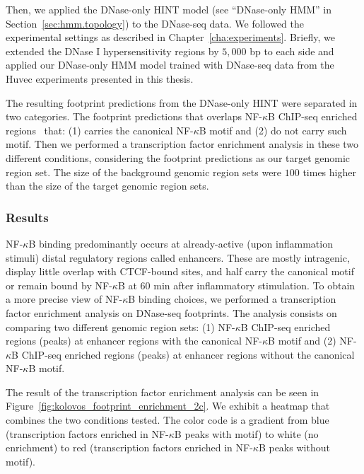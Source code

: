 Then, we applied the DNase-only HINT model (see ``DNase-only HMM'' in Section~\ref{sec:hmm.topology}) to the DNase-seq data. We followed the experimental settings as described in Chapter~\ref{cha:experiments}. Briefly, we extended the DNase I hypersensitivity regions by $5,000$ bp to each side and applied our DNase-only HMM model trained with DNase-seq data from the Huvec experiments presented in this thesis.

The resulting footprint predictions from the DNase-only HINT were separated in two categories. The footprint predictions that overlaps NF-$\kappa$B ChIP-seq enriched regions~\cite{papantonis2012} that: (1) carries the canonical NF-$\kappa$B motif and (2) do not carry such motif. Then we performed a transcription factor enrichment analysis in these two different conditions, considering the footprint predictions as our target genomic region set. The size of the background genomic region sets were $100$ times higher than the size of the target genomic region sets.

\subsubsection{Results}
\label{sec:cs2.results}

NF-$\kappa$B binding predominantly occurs at already-active (upon inflammation stimuli) distal regulatory regions called enhancers. These are mostly intragenic, display little overlap with CTCF-bound sites, and half carry the canonical motif or remain bound by NF-$\kappa$B at $60$ min after inflammatory stimulation. To obtain a more precise view of NF-$\kappa$B binding choices, we performed a transcription factor enrichment analysis on DNase-seq footprints. The analysis consists on comparing two different genomic region sets: (1) NF-$\kappa$B ChIP-seq enriched regions (peaks) at enhancer regions with the canonical NF-$\kappa$B motif and (2) NF-$\kappa$B ChIP-seq enriched regions (peaks) at enhancer regions without the canonical NF-$\kappa$B motif.

The result of the transcription factor enrichment analysis can be seen in Figure~\ref{fig:kolovos_footprint_enrichment_2c}. We exhibit a heatmap that combines the two conditions tested. The color code is a gradient from blue (transcription factors enriched in NF-$\kappa$B peaks with motif) to white (no enrichment) to red (transcription factors enriched in NF-$\kappa$B peaks without motif).

